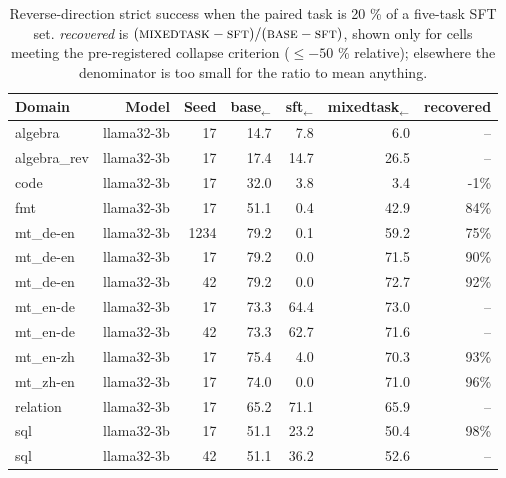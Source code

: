 \begin{table}[t]
\centering
\small
\begin{tabular}{lrrrrrr}
\toprule
Domain & Model & Seed & base$_\leftarrow$ & sft$_\leftarrow$ & mixedtask$_\leftarrow$ & recovered \\
\midrule
algebra & llama32-3b & 17 & 14.7 & 7.8 & 6.0 & -- \\
algebra\_rev & llama32-3b & 17 & 17.4 & 14.7 & 26.5 & -- \\
code & llama32-3b & 17 & 32.0 & 3.8 & 3.4 & -1\% \\
fmt & llama32-3b & 17 & 51.1 & 0.4 & 42.9 & 84\% \\
mt\_de-en & llama32-3b & 1234 & 79.2 & 0.1 & 59.2 & 75\% \\
mt\_de-en & llama32-3b & 17 & 79.2 & 0.0 & 71.5 & 90\% \\
mt\_de-en & llama32-3b & 42 & 79.2 & 0.0 & 72.7 & 92\% \\
mt\_en-de & llama32-3b & 17 & 73.3 & 64.4 & 73.0 & -- \\
mt\_en-de & llama32-3b & 42 & 73.3 & 62.7 & 71.6 & -- \\
mt\_en-zh & llama32-3b & 17 & 75.4 & 4.0 & 70.3 & 93\% \\
mt\_zh-en & llama32-3b & 17 & 74.0 & 0.0 & 71.0 & 96\% \\
relation & llama32-3b & 17 & 65.2 & 71.1 & 65.9 & -- \\
sql & llama32-3b & 17 & 51.1 & 23.2 & 50.4 & 98\% \\
sql & llama32-3b & 42 & 51.1 & 36.2 & 52.6 & -- \\
\bottomrule
\end{tabular}
\caption{Reverse-direction strict success when the paired task is 20 \% of a five-task SFT set. \emph{recovered} is $(\textsc{mixedtask}-\textsc{sft})/(\textsc{base}-\textsc{sft})$, shown only for cells meeting the pre-registered collapse criterion ($\le -50$ \% relative); elsewhere the denominator is too small for the ratio to mean anything.}
\label{tab:mixture}
\end{table}